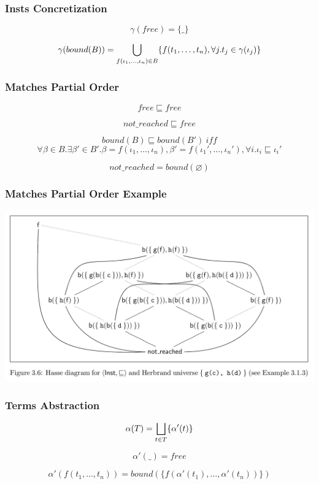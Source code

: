 \documentclass{beamer}
\newcommand{\wbigcup}{\mathop{\bigcup}\displaylimits}
\newcommand{\wbigsqcup}{\mathop{\bigsqcup}\displaylimits}
\begin{document}
\begin{frame}[fragile]
  \frametitle{Insts Concretization}
  $$
  \gamma(free) = \{ \_ \}
  $$

  $$
  \gamma(bound(B)) = \wbigcup_{f(\iota_1, \dots, \iota_n) \in B} \{ f(t_1, \dots, t_n), \forall j. t_j \in \gamma(\iota_j)\}
  $$
\end{frame}

\begin{frame}[fragile]
  \frametitle{Matches Partial Order}
  $$
  free \sqsubseteq free
  $$

  \vfill

  $$
  not\_reached \sqsubseteq free
  $$

  \vfill

  $$
  bound(B) \sqsubseteq bound(B') \ iff
  $$
  $$
  \forall \beta \in B. \exists \beta' \in B'. \beta = f (\iota_1, \dots, \iota_n), \beta' = f (\iota_1', \dots, \iota_n'), \forall i. \iota_i \sqsubseteq \iota_i'
  $$

  \vfill

  $$
  not\_reached = bound(\varnothing)
  $$
\end{frame}

\begin{frame}[fragile]
  \frametitle{Matches Partial Order Example}
\includegraphics[width=\textwidth]{pics/MatchesPO.png}
\end{frame}

\begin{frame}[fragile]
  \frametitle{Terms Abstraction}
$$
\alpha(T) = \wbigsqcup_{t \in T} \{ \alpha'(t) \}
$$

$$
\alpha'(\_) = free
$$

$$
\alpha'(f(t_1, \dots, t_n)) = bound(\{f(\alpha'(t_1), \dots, \alpha'(t_n))\})
$$
\end{frame}
\end{document}
